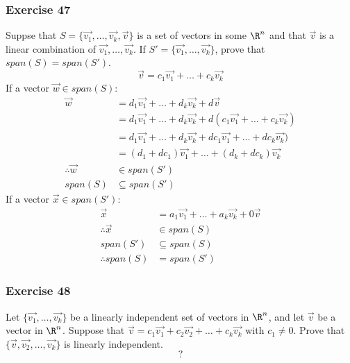 \documentclass[letterpaper, 12pt]{math}
\begin{document}
\subsubsection*{Exercise 47}
Suppse that \( S = \{\vec{v_1},\dots,\vec{v_k},\vec{v}\} \) is a set of vectors
in some \( \R^n \) and that \( \vec{v} \) is a linear combination of
\( \vec{v_1},\dots,\vec{v_k} \). If \( S' = \{\vec{v_1},\dots,\vec{v_k}\} \),
prove that \( span(S) = span(S') \).
\[ \vec{v} = c_1\vec{v_1}+\dots+c_k\vec{v_k} \]
If a vector \( \vec{w}\in span(S) \):
\begin{align*}
  \vec{w} &= d_1\vec{v_1}+\dots+d_k\vec{v_k}+d\vec{v} \\
  &= d_1\vec{v_1}+\dots+d_k\vec{v_k}+d(c_1\vec{v_1}+\dots+c_k\vec{v_k}) \\
  &= d_1\vec{v_1}+\dots+d_k\vec{v_k}+dc_1\vec{v_1}+\dots+dc_k\vec{v_k}) \\
  &= (d_1+dc_1)\vec{v_1}+\dots+(d_k+dc_k)\vec{v_k} \\
  \therefore \vec{w} &\in span(S') \\
  span(S) &\subseteq span(S')
\end{align*}
If a vector \( \vec{x}\in span(S') \):
\begin{align*}
  \vec{x} &= a_1\vec{v_1}+\dots+a_k\vec{v_k}+0\vec{v} \\
  \therefore \vec{x}&\in span(S) \\
  span(S') &\subseteq span(S) \\
  \therefore span(S) &= span(S')
\end{align*}

\subsubsection*{Exercise 48}
Let \( \{\vec{v_1},\dots,\vec{v_k}\} \) be a linearly independent set of vectors
in \( \R^n \), and let \( \vec{v} \) be a vector in \( \R^n \). Suppose that
\( \vec{v} = c_1\vec{v_1}+c_2\vec{v_2}+\dots+c_k\vec{v_k} \) with \( c_1 \ne 0
\). Prove that \( \{\vec{v},\vec{v_2},\dots,\vec{v_k}\} \) is linearly
independent.
\[ ? \]
\end{document}
